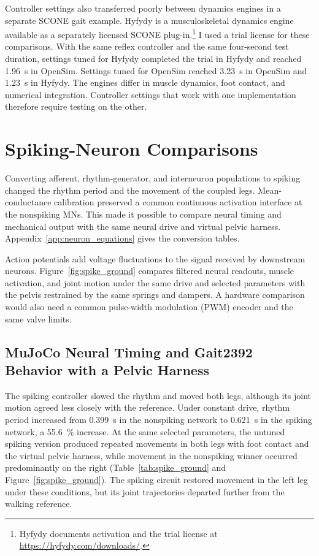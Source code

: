 Controller settings also transferred poorly between dynamics engines in a separate SCONE gait example. Hyfydy is a musculoskeletal dynamics engine available as a separately licensed SCONE plug-in.\footnote{Hyfydy documents activation and the trial license at \url{https://hyfydy.com/downloads/}.} I used a trial license for these comparisons. With the same reflex controller and the same four-second test duration, settings tuned for Hyfydy completed the trial in Hyfydy and reached \qty{1.96}{\second} in OpenSim. Settings tuned for OpenSim reached \qty{3.23}{\second} in OpenSim and \qty{1.23}{\second} in Hyfydy. The engines differ in muscle dynamics, foot contact, and numerical integration. Controller settings that work with one implementation therefore require testing on the other.

\section{Spiking-Neuron Comparisons}\label{sec:spiking_methods}\label{sec:spiking_results}\label{sec:disc_spiking}

Converting afferent, rhythm-generator, and interneuron populations to spiking changed the rhythm period and the movement of the coupled legs. Mean-conductance calibration preserved a common continuous activation interface at the nonspiking MNs. This made it possible to compare neural timing and mechanical output with the same neural drive and virtual pelvic harness. Appendix~\ref{app:neuron_equations} gives the conversion tables.

Action potentials add voltage fluctuations to the signal received by downstream neurons. Figure~\ref{fig:spike_ground} compares filtered neural readouts, muscle activation, and joint motion under the same drive and selected parameters with the pelvis restrained by the same springs and dampers. A hardware comparison would also need a common pulse-width modulation (PWM) encoder and the same valve limits.

\subsection{MuJoCo Neural Timing and Gait2392 Behavior with a Pelvic Harness}

The spiking controller slowed the rhythm and moved both legs, although its joint motion agreed less closely with the reference. Under constant drive, rhythm period increased from \qty{0.399}{\second} in the nonspiking network to \qty{0.621}{\second} in the spiking network, a \qty{55.6}{\percent} increase. At the same selected parameters, the untuned spiking version produced repeated movements in both legs with foot contact and the virtual pelvic harness, while movement in the nonspiking winner occurred predominantly on the right (Table~\ref{tab:spike_ground} and Figure~\ref{fig:spike_ground}). The spiking circuit restored movement in the left leg under these conditions, but its joint trajectories departed further from the walking reference.

